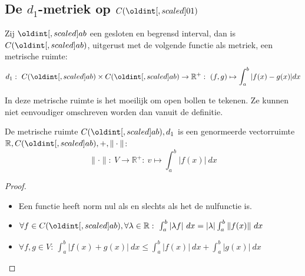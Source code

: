 \documentclass[main.tex]{subfiles}
\begin{document}
\subsection{De $d_1$-metriek op $C(\interval{0}{1})$}
\label{sec:de-d_1-metriek}

\begin{vb}
  Zij $\interval{a}{b}$ een gesloten en begrensd interval, dan is $C(\interval{a}{b})$, uitgerust met de volgende functie als metriek, een metrische ruimte:
  \[ d_{1}:\ C(\interval{a}{b})\times C(\interval{a}{b}) \rightarrow \mathbb{R}^{+}:\ (f,g) \mapsto \int_{a}^{b}|f(x)-g(x)|dx \]
\end{vb}

\begin{opm}
  In deze metrische ruimte is het moeilijk om open bollen te tekenen.
  Ze kunnen niet eenvoudiger omschreven worden dan vanuit de definitie.
\end{opm}

\begin{vb}
  De metrische ruimte $C(\interval{a}{b}),d_{1}$ is een genormeerde vectorruimte $\mathbb{R},C(\interval{a}{b}),+,\Vert\cdot\Vert$:
  \[ \|\cdot\|:\ V \rightarrow \mathbb{R}^{+}:\ v \mapsto \int_{a}^{b}\left|f(x)\right|\ dx \]

  \begin{proof}
    \noindent
    \begin{itemize}
    \item Een functie heeft norm nul als en slechts als het de nulfunctie is.
    \item $\forall f\in C(\interval{a}{b}), \forall \lambda \in \mathbb{R}:\ \int_{a}^{b}|\lambda f|\ dx = |\lambda|\int_{a}^{b}\|f(x)\|\ dx$
    \item $\forall f,g\in V:\ \int_{a}^{b}|f(x)+g(x)|\ dx \le \int_{a}^{b}|f(x)|\ dx + \int_{a}^{b}|g(x)|\ dx$
    \end{itemize}
  \end{proof}
\end{vb}
\end{document}
